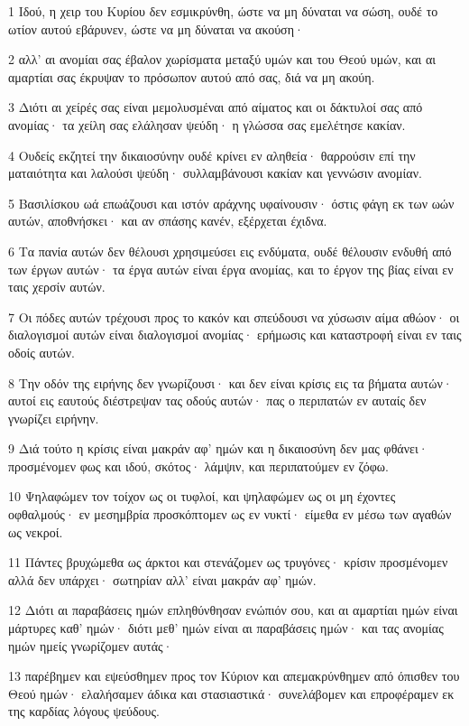\par 1 Ιδού, η χειρ του Κυρίου δεν εσμικρύνθη, ώστε να μη δύναται να σώση, ουδέ το ωτίον αυτού εβάρυνεν, ώστε να μη δύναται να ακούση·
\par 2 αλλ' αι ανομίαι σας έβαλον χωρίσματα μεταξύ υμών και του Θεού υμών, και αι αμαρτίαι σας έκρυψαν το πρόσωπον αυτού από σας, διά να μη ακούη.
\par 3 Διότι αι χείρές σας είναι μεμολυσμέναι από αίματος και οι δάκτυλοί σας από ανομίας· τα χείλη σας ελάλησαν ψεύδη· η γλώσσα σας εμελέτησε κακίαν.
\par 4 Ουδείς εκζητεί την δικαιοσύνην ουδέ κρίνει εν αληθεία· θαρρούσιν επί την ματαιότητα και λαλούσι ψεύδη· συλλαμβάνουσι κακίαν και γεννώσιν ανομίαν.
\par 5 Βασιλίσκου ωά επωάζουσι και ιστόν αράχνης υφαίνουσιν· όστις φάγη εκ των ωών αυτών, αποθνήσκει· και αν σπάσης κανέν, εξέρχεται έχιδνα.
\par 6 Τα πανία αυτών δεν θέλουσι χρησιμεύσει εις ενδύματα, ουδέ θέλουσιν ενδυθή από των έργων αυτών· τα έργα αυτών είναι έργα ανομίας, και το έργον της βίας είναι εν ταις χερσίν αυτών.
\par 7 Οι πόδες αυτών τρέχουσι προς το κακόν και σπεύδουσι να χύσωσιν αίμα αθώον· οι διαλογισμοί αυτών είναι διαλογισμοί ανομίας· ερήμωσις και καταστροφή είναι εν ταις οδοίς αυτών.
\par 8 Την οδόν της ειρήνης δεν γνωρίζουσι· και δεν είναι κρίσις εις τα βήματα αυτών· αυτοί εις εαυτούς διέστρεψαν τας οδούς αυτών· πας ο περιπατών εν αυταίς δεν γνωρίζει ειρήνην.
\par 9 Διά τούτο η κρίσις είναι μακράν αφ' ημών και η δικαιοσύνη δεν μας φθάνει· προσμένομεν φως και ιδού, σκότος· λάμψιν, και περιπατούμεν εν ζόφω.
\par 10 Ψηλαφώμεν τον τοίχον ως οι τυφλοί, και ψηλαφώμεν ως οι μη έχοντες οφθαλμούς· εν μεσημβρία προσκόπτομεν ως εν νυκτί· είμεθα εν μέσω των αγαθών ως νεκροί.
\par 11 Πάντες βρυχώμεθα ως άρκτοι και στενάζομεν ως τρυγόνες· κρίσιν προσμένομεν αλλά δεν υπάρχει· σωτηρίαν αλλ' είναι μακράν αφ' ημών.
\par 12 Διότι αι παραβάσεις ημών επληθύνθησαν ενώπιόν σου, και αι αμαρτίαι ημών είναι μάρτυρες καθ' ημών· διότι μεθ' ημών είναι αι παραβάσεις ημών· και τας ανομίας ημών ημείς γνωρίζομεν αυτάς·
\par 13 παρέβημεν και εψεύσθημεν προς τον Κύριον και απεμακρύνθημεν από όπισθεν του Θεού ημών· ελαλήσαμεν άδικα και στασιαστικά· συνελάβομεν και επροφέραμεν εκ της καρδίας λόγους ψεύδους.

